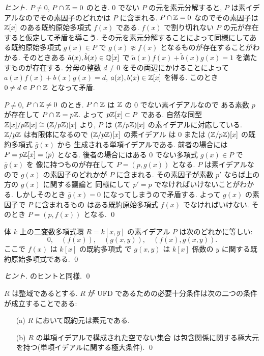 \documentclass[12pt,twoside]{jarticle}
\begin{document}
\begin{proof}[ヒント]
 $P\ne 0$, $P\cap{\mathbb Z}=0$ のとき.
 $0$ でない $P$ の元を素元分解すると, 
 $P$ は素イデアルなのでその素因子のどれかは $P$ に含まれる.
 $P\cap{\mathbb Z}=0$ なのでその素因子は ${\mathbb Z}[x]$ のある既約原始多項式 $f(x)$ である. 
 $f(x)$ で割り切れない $P$ の元が存在すると仮定して矛盾を導こう.
 その元を素元分解することによって同様にしてある既約原始多項式 $g(x)\in P$ 
 で $g(x)\not\approx f(x)$ となるものが存在することがわかる.
 そのときある $\tilde{a}(x),\tilde{b}(x)\in{\mathbb Q}[x]$ で %
 $\tilde{a}(x)f(x)+\tilde{b}(x)g(x)=1$ を満たすものが存在する.
 分母の整数 $d\ne 0$ をその両辺にかけることによって $a(x)f(x)+b(x)g(x)=d$, 
 $a(x),b(x)\in{\mathbb Z}[x]$ を得る. このとき $0\ne d\in P\cap{\mathbb Z}$ となって矛盾.

 $P\ne 0$, $P\cap{\mathbb Z}\ne 0$ のとき.
 $P\cap{\mathbb Z}$ は ${\mathbb Z}$ の $0$ でない素イデアルなので
 ある素数 $p$ が存在して $P\cap{\mathbb Z}=p{\mathbb Z}$.
 よって $p{\mathbb Z}[x]\subset P$ である.
 自然な同型 ${\mathbb Z}[x]/p{\mathbb Z}[x]\cong ({\mathbb Z}/p{\mathbb Z})[x]$ より, 
 $P$ は $({\mathbb Z}/p{\mathbb Z})[x]$ の素イデアルに対応している.
 ${\mathbb Z}/p{\mathbb Z}$ は有限体になるので $({\mathbb Z}/p{\mathbb Z})[x]$ の素イデアル
 は $0$ または $({\mathbb Z}/p{\mathbb Z})[x]$ の既約多項式 $\bar{g}(x)$ から
 生成される単項イデアルである.
 前者の場合には $P=p{\mathbb Z}[x]=(p)$ となる.
 後者の場合にはある $0$ でない多項式 $g(x)\in P$ で $\bar{g}(x)$ を
 像に持つものが存在して $P=(p,g(x))$ となる.
 $P$ は素イデアルなので $g(x)$ の素因子のどれかが $P$ に含まれる.
 その素因子が素数 $p'$ ならば上の方の $g(x)$ に関する議論と
 同様にして $p'=p$ でなければいけないことがわかる.
 しかしそのとき $\bar{g}(x)=0$ になってしまうので矛盾する. 
 よって $g(x)$ の素因子で $P$ に含まれるもの
 はある既約原始多項式 $f(x)$ でなければいけない. 
 そのとき $P=(p,f(x))$ となる.
 \qed
\end{proof}

\begin{question}[{$k[x,y]$} の素イデアルの分類]
 体 $k$ 上の二変数多項式環 $R=k[x,y]$ の素イデアル $P$ は次のどれかに等しい:
 \begin{equation*}
  0, \quad (f(x)), \quad (g(x,y)), \quad (f(x),g(x,y)).
 \end{equation*}
 ここで $f(x)$ は $k[x]$ の既約多項式
 で $g(x,y)$ は $k[x]$ 係数の $y$ に関する既約原始多項式である.
 \qed
\end{question}

\begin{proof}[ヒント]
  のヒントと同様.
 \qed
\end{proof}

\begin{question}[UFDの別の特徴付け]
\label{q:UFD-ideal-char}
 $R$ は整域であるとする.
 $R$ が UFD であるための必要十分条件は次の二つの条件が成立することである:
 \begin{enumerate}
 \item[(a)] $R$ において既約元は素元である.
 \item[(b)] $R$ の単項イデアルで構成された空でない集合
  は包含関係に関する極大元を持つ(単項イデアルに関する極大条件).
  \qed
 \end{enumerate}
\end{question}
\end{document}
